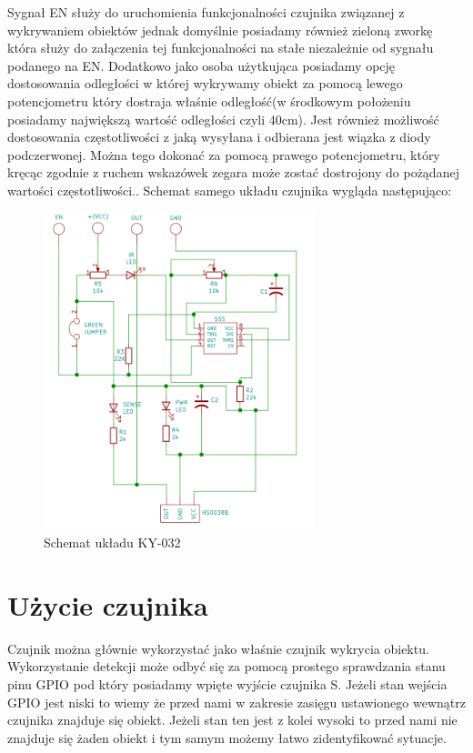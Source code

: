 \documentclass[11pt, a4paper]{article}
\begin{document}
Sygnał EN służy do uruchomienia funkcjonalności czujnika związanej z wykrywaniem obiektów jednak domyślnie posiadamy również zieloną zworkę która służy do załączenia tej funkcjonalności na stałe niezależnie od sygnału podanego na EN.
\newline
Dodatkowo jako osoba użytkująca posiadamy opcję dostosowania odległości w której wykrywamy obiekt za pomocą lewego potencjometru który dostraja właśnie odległość(w środkowym położeniu posiadamy największą wartość odległości czyli 40cm). Jest również możliwość dostosowania częstotliwości z jaką wysyłana i odbierana jest wiązka z diody podczerwonej. Można tego dokonać za pomocą prawego potencjometru, który kręcąc zgodnie z ruchem wskazówek zegara może zostać dostrojony do pożądanej wartości częstotliwości.. 
\newline
Schemat samego układu czujnika wygląda następująco:
\begin{figure}[H]
    \centering
    \includegraphics[width=0.7\textwidth]{fig/KY-032/zasada_dzialania/schemat.png}
    \caption{Schemat układu KY-032}
\end{figure}

\newpage

\section{Użycie czujnika}
Czujnik można głównie wykorzystać jako właśnie czujnik wykrycia obiektu. Wykorzystanie detekcji może odbyć się za pomocą prostego sprawdzania stanu pinu GPIO pod który posiadamy wpięte wyjście czujnika S. Jeżeli stan wejścia GPIO jest niski to wiemy że przed nami w zakresie zasięgu ustawionego wewnątrz czujnika znajduje się obiekt. Jeżeli stan ten jest z kolei wysoki to przed nami nie znajduje się żaden obiekt i tym samym możemy łatwo zidentyfikować sytuacje.
\end{document}

